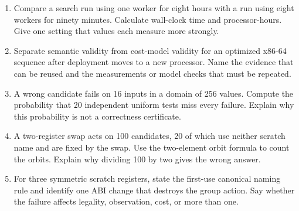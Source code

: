 \begin{enumerate}
\item Compare a search run using one worker for eight hours with a run using
eight workers for ninety minutes. Calculate wall-clock time and
processor-hours. Give one setting that values each measure more strongly.

\item Separate semantic validity from cost-model validity for an optimized
x86-64 sequence after deployment moves to a new processor. Name the evidence
that can be reused and the measurements or model checks that must be repeated.

\item A wrong candidate fails on 16 inputs in a domain of 256 values. Compute
the probability that 20 independent uniform tests miss every failure. Explain
why this probability is not a correctness certificate.

\item A two-register swap acts on 100 candidates, 20 of which use neither
scratch name and are fixed by the swap. Use the two-element orbit formula to
count the orbits. Explain why dividing 100 by two gives the wrong answer.

\item For three symmetric scratch registers, state the first-use canonical
naming rule and identify one ABI change that destroys the group action. Say
whether the failure affects legality, observation, cost, or more than one.
\end{enumerate}
